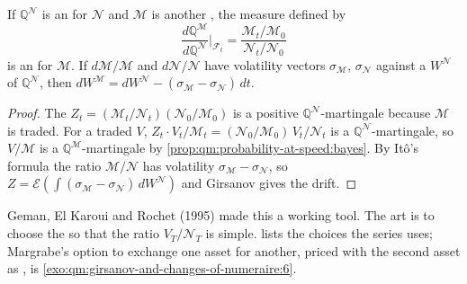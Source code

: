 \begin{theorem}\label{thm:qm:girsanov-and-changes-of-numeraire:change}
If $\mathbb Q^{\mathcal N}$ is an  for $\mathcal N$ and $\mathcal M$ is another
, the measure defined by
\[
\frac{d\mathbb Q^{\mathcal M}}{d\mathbb Q^{\mathcal N}}\bigg|_{\mathcal F_t} = \frac{\mathcal M_t/\mathcal M_0}{\mathcal N_t/\mathcal N_0}
\]
is an  for $\mathcal M$. If $d\mathcal M/\mathcal M$ and $d\mathcal N/\mathcal N$ have
volatility vectors $\sigma_{\mathcal M}$, $\sigma_{\mathcal N}$ against a  $W^{\mathcal N}$ of $\mathbb
Q^{\mathcal N}$, then $dW^{\mathcal M} = dW^{\mathcal N} - (\sigma_{\mathcal M} - \sigma_{\mathcal N})\,dt$.
\end{theorem}

\begin{proof}
The  $Z_t = (\mathcal M_t/\mathcal N_t)(\mathcal N_0/\mathcal M_0)$ is a positive $\mathbb Q^{\mathcal N}$-martingale
because $\mathcal M$ is traded. For a traded $V$, $Z_t\cdot V_t/\mathcal M_t = (\mathcal N_0/\mathcal M_0)\,V_t/\mathcal N_t$ is a
$\mathbb Q^{\mathcal N}$-martingale, so $V/\mathcal M$ is a $\mathbb Q^{\mathcal M}$-martingale by
\cref{prop:qm:probability-at-speed:bayes}. By Itô's formula the ratio $\mathcal M/\mathcal N$ has volatility
$\sigma_{\mathcal M} - \sigma_{\mathcal N}$, so $Z = \mathcal E(\int(\sigma_{\mathcal M} - \sigma_{\mathcal N})\,dW^{\mathcal N})$ and Girsanov
gives the drift.
\end{proof}

Geman, El Karoui and Rochet (1995) made this a working tool. The art is to choose the
 so that the ratio $V_T/\mathcal N_T$ is simple. 
lists the choices the series uses; Margrabe's option to exchange one asset for another, priced
with the second asset as , is \cref{exo:qm:girsanov-and-changes-of-numeraire:6}.

